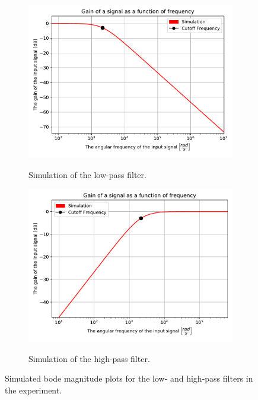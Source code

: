 \begin{figure}[H]
\centering
	\begin{subfigure}[b]{0.49\textwidth}
		\includegraphics[width=\textwidth]{fig/img/LPF_sim.pdf}
    		\label{fig:lpf_sim}
    		\caption{Simulation of the low-pass filter.}
	\end{subfigure}
	\begin{subfigure}[b]{0.49\textwidth}
		\includegraphics[width=\textwidth]{fig/img/HPF_sim.pdf}
    		\label{fig:hpf_sim}
    		\caption{Simulation of the high-pass filter.}
	\end{subfigure}
\caption{Simulated bode magnitude plots for the low- and high-pass filters in the experiment.}
\end{figure}


